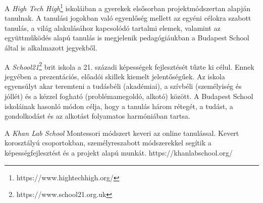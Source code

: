 A \emph{High Tech High}\footnote{https://www.hightechhigh.org/} iskoláiban a gyerekek elsősorban projektmódszertan alapján tanulnak. A tanulási jogokban való egyenlőség mellett az egyéni célokra szabott tanulás, a világ alakulásához kapcsolódó tartalmi elemek, valamint az együttműködés alapú tanulás is megjelenik pedagógiáukban a Budapest School által is alkalmazott jegyekből.

A \emph{School21}\footnote{https://www.school21.org.uk} brit iskola a 21. századi képességek fejlesztését tűzte ki célul. Ennek jegyében a prezentációs, előadói skillek kiemelt jelentőségűek. Az iskola egyensúlyt akar teremteni a tudásbéli (akadémiai), a szívbéli (személyiség és jóllét) és a kézzel fogható (problémamegoldó, alkotó) között. A Budapest School iskoláinak hasonló módon célja, hogy a tanulás három rétegét, a tudást, a gondolkodást és az alkotást folyamatos harmóniában tartsa.

A \emph{Khan Lab School} Montessori módszert keveri az online tanulással. Kevert korosztályú csoportokban, személyreszabott módszerekkel segítik a képességfejlesztést és a projekt alapú munkát. https://khanlabschool.org/
